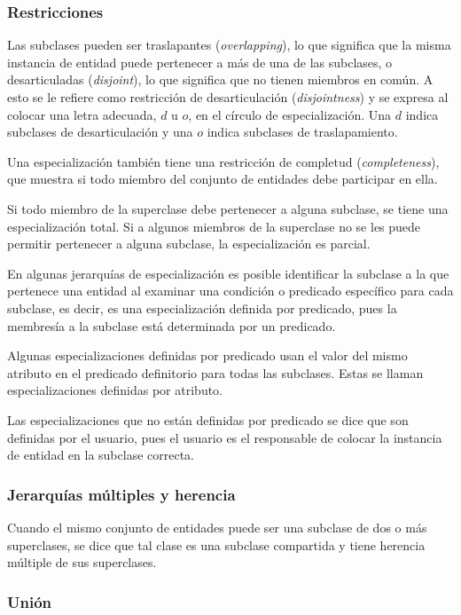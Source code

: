 \subsubsection{Restricciones}

Las subclases pueden ser traslapantes (\textit{overlapping}), lo que significa que la misma instancia de entidad puede pertenecer a más de una de las subclases, o desarticuladas (\textit{disjoint}), lo que significa que no tienen miembros en común. A esto se le refiere como restricción de desarticulación (\textit{disjointness}) y se expresa al colocar una letra adecuada, $d$ u $o$, en el círculo de especialización. Una $d$ indica subclases de desarticulación y una $o$ indica subclases de traslapamiento. 


Una especialización también tiene una restricción de completud (\textit{completeness}), que muestra si todo miembro del conjunto de entidades debe participar en ella.


Si todo miembro de la superclase debe pertenecer a alguna subclase, se tiene una especialización total. Si a algunos miembros de la superclase no se les puede permitir pertenecer a alguna subclase, la especialización es parcial.


En algunas jerarquías de especialización es posible identificar la subclase a la que pertenece una entidad al examinar una condición o predicado específico para cada subclase, es decir, es una especialización definida por predicado, pues la membresía a la subclase está determinada por un predicado.


Algunas especializaciones definidas por predicado usan el valor del mismo atributo en el predicado definitorio para todas las subclases. Estas se llaman especializaciones definidas por atributo. 


Las especializaciones que no están definidas por predicado se dice que son definidas por el usuario, pues el usuario es el responsable de colocar la instancia de entidad en la subclase correcta.


\subsubsection{Jerarquías múltiples y herencia}

Cuando el mismo conjunto de entidades puede ser una subclase de dos o más superclases, se dice que tal clase es una subclase compartida y tiene herencia múltiple de sus superclases.


\subsubsection{Unión}

